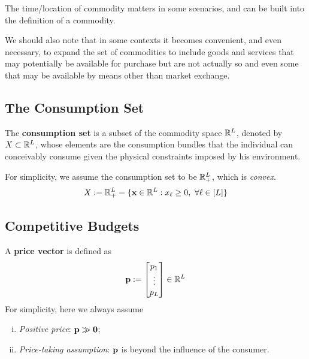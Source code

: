 \documentclass{article}
\begin{document}
 			\begin{remark}
 				The time/location of commodity matters in some scenarios, and can be built into the definition of a commodity.
 			\end{remark}
 			
 			\begin{remark}
 				We should also note that in some contexts it becomes convenient, and even necessary, to expand the set of commodities to include goods and services that may potentially be available for purchase but are not actually so and even some that may be available by means other than market exchange.
 			\end{remark}
 		
 		\subsection{The Consumption Set}
 			\begin{definition}
 				The \textbf{consumption set} is a subset of the commodity space $\mathbb{R}^L$, denoted by $X \subset \mathbb{R}^L$, whose elements are the consumption bundles that the individual can conceivably consume given the physical constraints imposed by his environment.
 			\end{definition}
 			
 			\begin{assumption}
 				For simplicity, we assume the consumption set to be $\mathbb{R}_+^L$, which is \emph{convex}.
 				\begin{equation}
 					X := \R_+^L = \{\vex \in \R^L: x_{\ell} \geq 0,\ \forall \ell \in [L]\}
 				\end{equation}
 			\end{assumption}
 			
 		\subsection{Competitive Budgets}
 			\begin{definition}
 				A \textbf{price vector} is defined as
 				\begin{equation}
 					\textbf{p} := \begin{bmatrix} p_1 \\ \vdots \\ p_L \end{bmatrix} \in \mathbb{R}^L
 				\end{equation}
 				For simplicity, here we always assume 
 				\begin{enumerate}[(i)]
 					\item \emph{Positive price}: $\textbf{p} \gg \textbf{0}$;
 					\item \emph{Price-taking assumption}: $\textbf{p}$ is beyond the influence of the consumer.
 				\end{enumerate}
 			\end{definition}
 			
\end{document}
